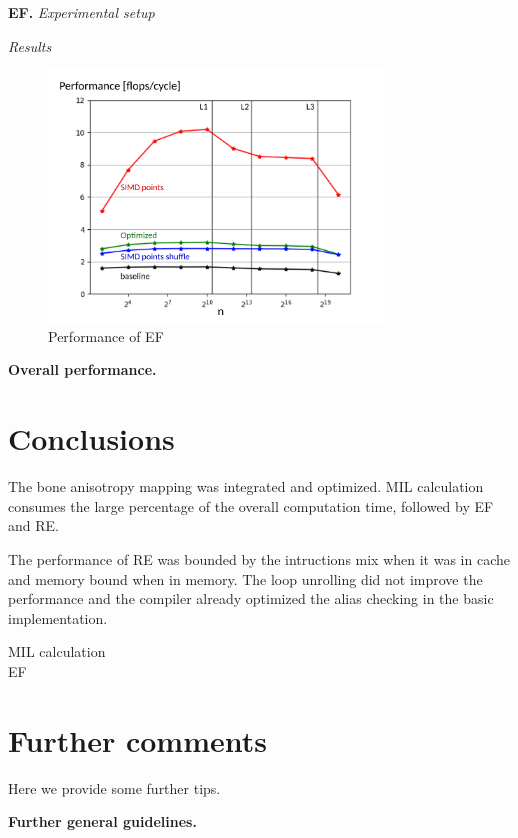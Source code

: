 \documentclass[letterpaper]{article}
\newcommand{\mypar}[1]{{\bf #1.}}
\begin{document}
\mypar{EF} \textit{Experimental setup}

\textit{Results}
 
\begin{figure}[H]
  \centering \includegraphics[width=3.5in]{figs/plots/ellipsoid/ellipsoid_performance.pdf}
  \caption{Performance of EF}
  \label{res:ellipsoid}
\end{figure}


\mypar{Overall performance}

\section{Conclusions}

The bone anisotropy mapping was integrated and optimized. MIL calculation consumes the large percentage of the overall computation time, followed by EF and RE. 

The performance of RE was bounded by the intructions mix when it was in cache and memory bound when in memory. The loop unrolling did not improve the performance and the compiler already optimized the alias checking in the basic implementation.

MIL calculation\\

EF\\


\section{Further comments}

Here we provide some further tips. 

\mypar{Further general guidelines}



\end{document}
